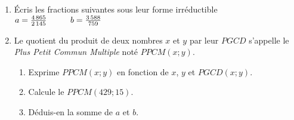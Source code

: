 
\begin{enumerate}
\item \'Ecris les fractions suivantes sous leur forme irréductible
$a=\frac{4\,865}{2\,145}\kern1cm b=\frac{3\,588}{759}$
\item Le quotient du produit de deux nombres $x$ et $y$ par leur $PGCD$
s'appelle le {\em Plus Petit Commun Multiple} noté $PPCM(x;y)$.
\begin{enumerate}
\item Exprime $PPCM(x;y)$ en fonction de $x$, $y$ et $PGCD(x;y)$.
\item Calcule le $PPCM(429;15)$.
\item Déduis-en la somme de $a$ et $b$.
\end{enumerate}
\end{enumerate}
